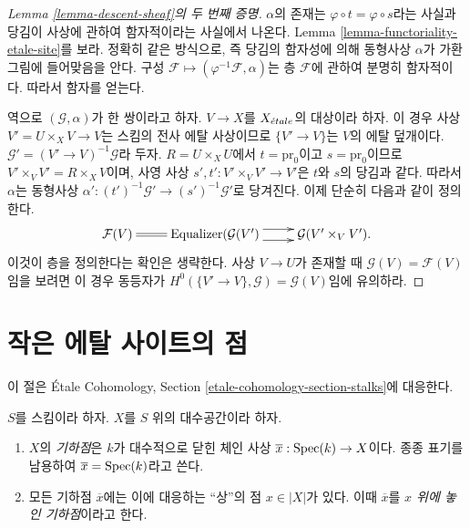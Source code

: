 \begin{proof}[Lemma \ref{lemma-descent-sheaf}의 두 번째 증명]
$\alpha$의 존재는 $\varphi \circ t = \varphi \circ s$라는 사실과
당김이 사상에 관하여 함자적이라는 사실에서 나온다.
Lemma \ref{lemma-functoriality-etale-site}를 보라.
정확히 같은 방식으로, 즉 당김의 함자성에 의해 동형사상
$\alpha$가 가환 그림에 들어맞음을 안다.
구성 $\mathcal{F} \mapsto (\varphi^{-1}\mathcal{F}, \alpha)$는
층 $\mathcal{F}$에 관하여 분명히 함자적이다.
따라서 함자를 얻는다.

\medskip\noindent
역으로 $(\mathcal{G}, \alpha)$가 한 쌍이라고 하자.
$V \to X$를 $X_{\acute{e}tale}$의 대상이라 하자.
이 경우 사상 $V' = U \times_X V \to V$는 스킴의 전사 에탈 사상이므로
$\{V' \to V\}$는 $V$의 에탈 덮개이다.
$\mathcal{G}' = (V' \to V)^{-1}\mathcal{G}$라 두자.
$R = U \times_X U$에서 $t = \text{pr}_0$이고
$s = \text{pr}_0$이므로 $V' \times_V V' = R \times_X V$이며,
사영 사상 $s', t' : V' \times_V V' \to V'$은 $t$와 $s$의
당김과 같다. 따라서 $\alpha$는 동형사상
$\alpha' : (t')^{-1}\mathcal{G}' \to (s')^{-1}\mathcal{G}'$로 당겨진다.
이제 단순히 다음과 같이 정의한다.
$$
\xymatrix{
\mathcal{F}(V) \ar@{=}[r] &
\text{Equalizer}(\mathcal{G}(V') \ar@<1ex>[r] \ar@<-1ex>[r] &
\mathcal{G}(V' \times_V V').
}
$$
이것이 층을 정의한다는 확인은 생략한다. 사상 $V \to U$가 존재할 때
$\mathcal{G}(V) = \mathcal{F}(V)$임을 보려면 이 경우 동등자가
$H^0(\{V' \to V\}, \mathcal{G}) = \mathcal{G}(V)$임에 유의하라.
\end{proof}

\section{작은 에탈 사이트의 점}
\label{section-points-small-etale-site}

\noindent
이 절은 \'Etale Cohomology, Section
\ref{etale-cohomology-section-stalks}에 대응한다.

\begin{definition}
\label{definition-geometric-point}
$S$를 스킴이라 하자. $X$를 $S$ 위의 대수공간이라 하자.
\begin{enumerate}
\item $X$의 {\it 기하점}은 $k$가 대수적으로 닫힌 체인 사상
$\overline{x} : \mathop{\mathrm{Spec}}(k) \to X$이다. 종종 표기를 남용하여
$\overline{x} = \mathop{\mathrm{Spec}}(k)$라고 쓴다.
\item 모든 기하점 $\overline{x}$에는 이에 대응하는 “상”의 점
$x \in |X|$가 있다. 이때 $\overline{x}$를
{\it $x$ 위에 놓인 기하점}이라고 한다.
\end{enumerate}
\end{definition}

